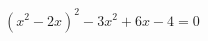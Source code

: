 \begin{ex}[type=equation]
	\begin{condition}
		\( (x^2-2x)^2 -3x^2+6x-4=0\)
	\end{condition}
\end{ex}